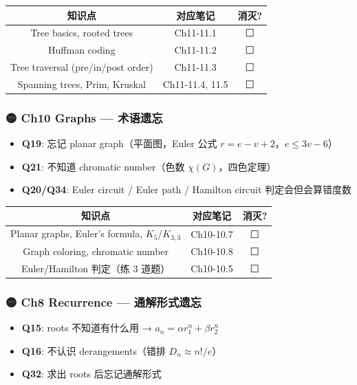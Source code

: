 \documentclass[10pt,a4paper,openany]{ctexbook}
\theoremstyle{definition}
\theoremstyle{remark}
\begin{document}
\begin{center}
\begin{tabular}{ccc}
\hline
知识点 & 对应笔记 & 消灭? \\ \hline
Tree basics, rooted trees & Ch11-11.1 & ⬜ \\
Huffman coding & Ch11-11.2 & ⬜ \\
Tree traversal (pre/in/post order) & Ch11-11.3 & ⬜ \\
Spanning trees, Prim, Kruskal & Ch11-11.4, 11.5 & ⬜ \\
\hline
\end{tabular}

\end{center}

\subsubsection{🟡 Ch10 Graphs — 术语遗忘}

\begin{itemize}
\item \textbf{Q19}: 忘记 planar graph（平面图，Euler 公式 $r=e-v+2$，$e\le 3v-6$）
\item \textbf{Q21}: 不知道 chromatic number（色数 $\chi(G)$，四色定理）
\item \textbf{Q20/Q34}: Euler circuit / Euler path / Hamilton circuit 判定会但会算错度数

\end{itemize}

\begin{center}
\begin{tabular}{ccc}
\hline
知识点 & 对应笔记 & 消灭? \\ \hline
Planar graphs, Euler's formula, $K_5$/$K_{3,3}$ & Ch10-10.7 & ⬜ \\
Graph coloring, chromatic number & Ch10-10.8 & ⬜ \\
Euler/Hamilton 判定（练 3 道题） & Ch10-10.5 & ⬜ \\
\hline
\end{tabular}

\end{center}

\subsubsection{🟡 Ch8 Recurrence — 通解形式遗忘}

\begin{itemize}
\item \textbf{Q15}: roots 不知道有什么用 → $a_n = αr_1^n + βr_2^n$
\item \textbf{Q16}: 不认识 derangements（错排 $D_n \approx n!/e$）
\item \textbf{Q32}: 求出 roots 后忘记通解形式

\end{itemize}
\end{document}

